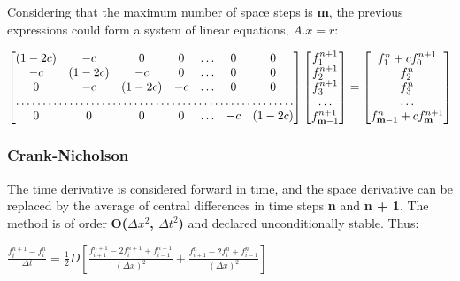 \documentclass[12pt]{report}
\begin{document}
\par Considering that the maximum number of space steps is \textbf{m}, the previous expressions could form a system of linear equations, $A.x = r$:
\begin{center}
$
\begin{bmatrix}
    (1 - 2c) & -c & 0 & 0 & \dots & 0 & 0 \\
    -c & (1 - 2c) & -c & 0 & \dots & 0 & 0 \\
    0 & -c & (1 - 2c) & -c & \dots & 0 & 0 \\
    \hdotsfor{7} \\
    0 & 0 & 0 & 0 & \dots & -c & (1 - 2c) \\
\end{bmatrix}
\begin{bmatrix}
    f_1^{n + 1} \\
    f_2^{n + 1} \\
    f_3^{n + 1} \\
    \dots \\
    f_{\textbf{m} - 1}^{n + 1} \\
\end{bmatrix}
=
\begin{bmatrix}
    f_1^{n} + c f_0^{n + 1} \\
    f_2^{n} \\
    f_3^{n} \\
    \dots \\
    f_{\textbf{m} - 1}^{n} + c f_{\textbf{m}}^{n + 1} \\
\end{bmatrix}
$
\end{center}


\subsubsection*{Crank-Nicholson}
\par The time derivative is considered forward in time, and the space derivative can be replaced by the average of central differences in time steps \textbf{n} and \textbf{n + 1}. The method is of order \textbf{O($\Delta x ^2$, $\Delta t ^2$)} and declared unconditionally stable. Thus:

\begin{center}
\Large
$
\frac{f_i^{n + 1} - f_i^{n}}{\Delta t} = \frac{1}{2} D {\left[\frac{f_{i + 1}^{n + 1} - 2f_{i}^{n + 1} + f_{i - 1}^{n + 1}}{(\Delta x)^2} + \frac{f_{i + 1}^{n} - 2f_{i}^{n} + f_{i - 1}^{n}}{(\Delta x)^2}\right]}
$
\end{center}
\end{document}
